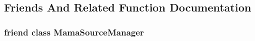 \subsection{Friends And Related Function Documentation}
\hypertarget{classWombat_1_1MamaSourceManager_1_1iterator_a22e83cca18603c329a5bce3b0389ea75}{
\subsubsection[{MamaSourceManager}]{\setlength{\rightskip}{0pt plus 5cm}friend class {\bf MamaSourceManager}}}
\label{classWombat_1_1MamaSourceManager_1_1iterator_a22e83cca18603c329a5bce3b0389ea75}
